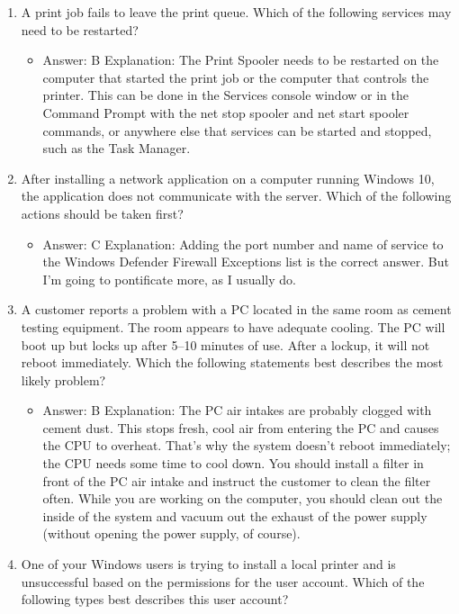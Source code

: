 \documentclass{article}
\begin{document}
\begin{enumerate}
    \item A print job fails to leave the print queue. Which of the following
services may need to be restarted?
    \begin{itemize}
        \item Answer: B
Explanation: The Print Spooler needs to be restarted on the computer that started the
print job or the computer that controls the printer. This can be done in the Services
console window or in the Command Prompt with the net stop spooler and net
start spooler commands, or anywhere else that services can be started and
stopped, such as the Task Manager.
    \end{itemize}
    \item After installing a network application on a computer running
Windows 10, the application does not communicate with the
server. Which of the following actions should be taken first?
    \begin{itemize}
        \item Answer: C
Explanation: Adding the port number and name of service to the Windows Defender
Firewall Exceptions list is the correct answer. But I’m going to pontificate more, as I
usually do.
    \end{itemize}
    \item A customer reports a problem with a PC located in the same room
as cement testing equipment. The room appears to have adequate
cooling. The PC will boot up but locks up after 5–10 minutes of
use. After a lockup, it will not reboot immediately. Which the following
statements best describes the most likely problem?
    \begin{itemize}
        \item Answer: B
Explanation: The PC air intakes are probably clogged with cement dust. This stops
fresh, cool air from entering the PC and causes the CPU to overheat. That’s why the
system doesn’t reboot immediately; the CPU needs some time to cool down. You
should install a filter in front of the PC air intake and instruct the customer to clean the
filter often. While you are working on the computer, you should clean out the inside
of the system and vacuum out the exhaust of the power supply (without opening the
power supply, of course).
    \end{itemize}
    \item One of your Windows users is trying to install a local printer and
is unsuccessful based on the permissions for the user account.
Which of the following types best describes this user account?

\end{enumerate}
\end{document}
